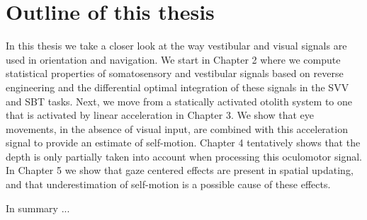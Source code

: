 \section{Outline of this thesis}
In this thesis we take a closer look at the way vestibular and visual signals are used in orientation and navigation. We start in Chapter 2 where we compute statistical properties of somatosensory and vestibular signals based on reverse engineering and the differential optimal integration of these signals in the SVV and SBT tasks. Next, we move from a statically activated otolith system to one that is activated by linear acceleration in Chapter 3. We show that eye movements, in the absence of visual input, are combined with this acceleration signal to provide an estimate of self-motion. Chapter 4 tentatively shows that the depth is only partially taken into account when processing this oculomotor signal. In Chapter 5 we show that gaze centered effects are present in spatial updating, and that underestimation of self-motion is a possible cause of these effects.

In summary ...
